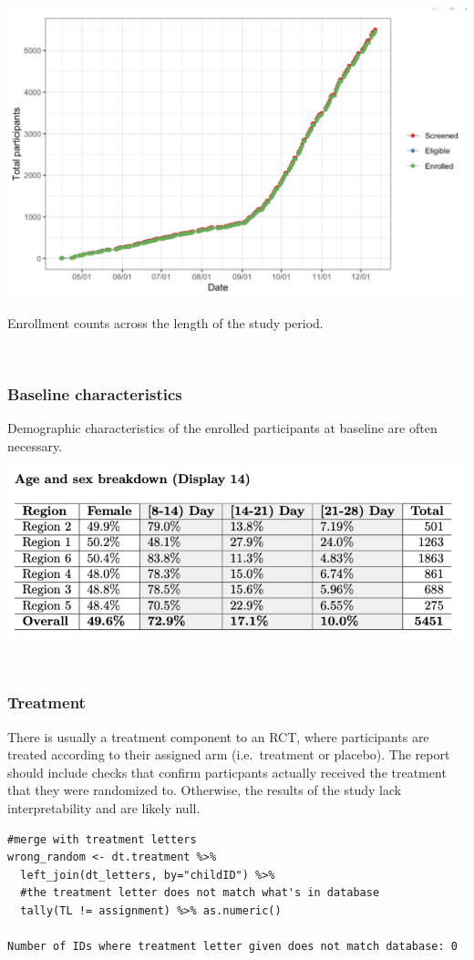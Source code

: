 \documentclass[
]{book}
\begin{document}
\includegraphics[width=0.7\linewidth,height=0.5\textheight]{images/report-images/enrollment2}

Enrollment counts across the length of the study period.

\(~\)

\subsubsection{Baseline characteristics}\label{baseline-characteristics}

Demographic characteristics of the enrolled participants at baseline are often necessary.

\includegraphics[width=0.6\linewidth,height=0.4\textheight]{images/report-images/baseline}

\(~\)

\subsubsection{Treatment}\label{treatment}

There is usually a treatment component to an RCT, where participants are treated according to their assigned arm (i.e.~treatment or placebo). The report should include checks that confirm particpants actually received the treatment that they were randomized to. Otherwise, the results of the study lack interpretability and are likely null.

\begin{verbatim}
#merge with treatment letters
wrong_random <- dt.treatment %>%
  left_join(dt_letters, by="childID") %>%
  #the treatment letter does not match what's in database
  tally(TL != assignment) %>% as.numeric()

Number of IDs where treatment letter given does not match database: 0
\end{verbatim}
\end{document}
